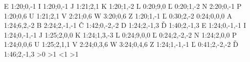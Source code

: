 \declCap E {1:20;0,-1}
\declCap I {1:20;0,-1}
\declCap J {1:21;2,1}
\declCap K {1:20;1,-2} 
\declCap L {0:20;9,0}
\declCap Ľ {0:20;1,-2}
\declCap N {2:20;0,-1}
\declCap P {1:20;0,6} 
\declCap U {1:21;2,1}
\declCap V {2:21;0,6}
\declCap W {3:20;0,6}
\declCap Z {1:20;1,-1}
\ifdim\hsize < \MinHsize \declCap Č {-1.2:31;0,-2} \else
\declCap Č {1:31;0,-2} \fi
\ifx\FontType\CMCS \declCap Ľ {0:30;2,-2} \else \ifdim\hsize < \MinHsize
\declCap Č {-1.2:36;0,-2} \else \declCap Č {1:36;0,-2}
\fi\fi
\ifnum{}
 {0:24;0,0,0}  %
\declCap A {1:24;6,2,-2}
\declCap B {2:24;2,-1,-1}
\declCap Č {1:42;0,-2,-2}
\declCap D {1:24;2,-1,3} 
\declCap Ď {1:40;2,-1,3}
\declCap E {1:24;0,-1,-1}
\declCap I {1:24;0,-1,-1}
\declCap J {1:25;2,0,0}
\declCap K {1:24;1,3,-3}
\declCap L {0:24;9,0,0}
\declCap Ľ {0:24;2,-2,-2}
\declCap N {1:24;2,0,0}
\declCap P {1:24;0,0,6}
\declCap U {1:25;2,1,1}
\declCap V {2:24;0,3,6}
\declCap W {3:24;0,4,6} 
\declCap Z {1:24;1,-1,-1}
\ifx\FontType\CMCS 
\declCap Ľ {0:41;2,-2,-2}
\else
\declCap Ď {1:46;2,-1,3}
\fi\fi
\def\CapIskip{} \def\CapIIskip{} 
\def\HIleftOff{} \def\HIIleftOff{} \def\HIleftOn{} \def\HIIleftOn{}
\ifnum\IfCapInsert>0 \let\nli\nl \let\CapIskip=\smallskip 
\let\HIleftOff=\HPleftOff \let\HIleftOn=\HPleftOn \else 
\def\nli{\nl\indent}\fi
\ifnum\IfCapInsert>1 \let\nlii\nl \let\CapIIskip=\smallskip 
\let\HIIleftOff=\HPleftOff \let\HIIleftOn=\HPleftOn \else 
\def\nlii{\nl\indent}\fi
\ifnum\IfCapInsert<1 \def\CapInsert{\noindent} \def\CapIInsert{\noindent} \else 
\ifnum\IfCapInsert>1 \let\CapInsert=\Capinsert \let\CapIInsert=\Capinsert  
\else                \let\CapInsert=\Capinsert \def\CapIInsert{\noindent}\fi\fi
\def\LeftCapIMaterial#1{{\ifnum\IfCapInsert<1 {#1}\else
\thefontscale[\magstep2]\localcolor\Grey\hboxshift{34\ptex}{#1}\kern0pt\fi}}
\def\LeftCapIIMaterial#1{{\ifnum\IfCapInsert<2 {#1}\else
\thefontscale[\magstep2]\localcolor\Grey\hboxshift{34\ptex}{#1}\kern0pt\fi}}
\ifnum{}
\def\LeftCapIMaterial#1{{\ifnum\IfCapInsert<1 {#1}\else
\thefontscale[\magstep3]\localcolor\Grey\hboxshift{62\ptex}{#1}\kern0pt\fi}}
\def\LeftCapIIMaterial#1{{\ifnum\IfCapInsert<2 {#1}\else
\thefontscale[\magstep3]\localcolor\Grey\hboxshift{62\ptex}{#1}\kern0pt\fi}}
\fi


\endinput

